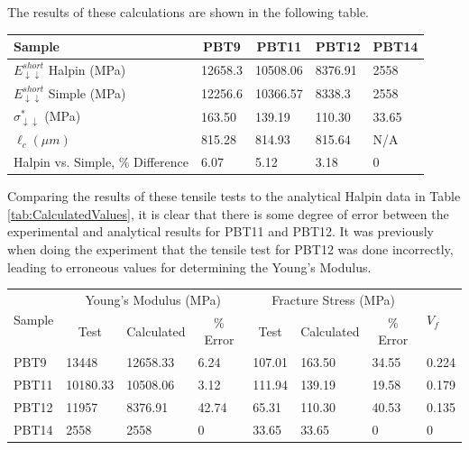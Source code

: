 \documentclass[11pt]{article}
\begin{document}
The results of these calculations are shown in the following table.
\\
\onehalfspacing
\begin{center}
 \label{tab:CalculatedValues}
\begin{tabular}{p{3.5cm} || p{} | p{} | p{} | p{}}
\hline
Sample & \multicolumn{1}{c|}{PBT9} & \multicolumn{1}{c|}{PBT11} & \multicolumn{1}{c|}{PBT12} & \multicolumn{1}{c}{PBT14} \\
\hline
\hline
\(E^{short}_{\downarrow \downarrow}\) Halpin (MPa)& 12658.3 &  10508.06 & 8376.91 & 2558\\
\(E^{short}_{\downarrow \downarrow}\) Simple (MPa)& 12256.6 & 10366.57 & 8338.3 & 2558\\
\(\sigma^*_{\downarrow \downarrow}\) (MPa)& 163.50 & 139.19 & 110.30 & 33.65\\
\(\ell_c (\mu m) \) & 815.28 & 814.93 & 815.64 & N/A\\
\hline
Halpin vs. Simple, \% Difference & 6.07 & 5.12 & 3.18 & 0\\
\hline
\end{tabular}
\end{center}
\singlespacing

Comparing the results of these tensile tests to the analytical Halpin data in Table \ref{tab:CalculatedValues}, it is clear that there is some degree of error between the experimental and analytical results for PBT11 and PBT12. It was previously when doing the experiment that the tensile test for PBT12 was done incorrectly, leading to erroneous values for determining the Young's Modulus.

\onehalfspacing
\begin{center}
 \label{tab:ComparingValues}
\begin{tabular}{p{1.25cm} || p{1.5cm} | p{1.5cm} | p{1.5cm} | p{1.5cm} | p{1.5cm} | p{1.5cm} | p{1cm}}
\hline
 \multirow{2}{*}{Sample} & \multicolumn{3}{c|}{Young's Modulus (MPa)}  & 
   \multicolumn{3}{c|}{Fracture Stress (MPa)} & \multirow{2}{*}{\(V_f\)} \\
   & \multicolumn{1}{c}{Test} & \multicolumn{1}{c}{Calculated} & \multicolumn{1}{c|}{\% Error} & \multicolumn{1}{c}{Test} & \multicolumn{1}{c}{Calculated} & \multicolumn{1}{c|}{\% Error} &\\
\hline
PBT9 & 13448 & 12658.33 & 6.24 & 107.01 & 163.50 & 34.55 & 0.224\\
PBT11 & 10180.33 & 10508.06 & 3.12 & 111.94 & 139.19 & 19.58 & 0.179\\
PBT12 & 11957 & 8376.91 & 42.74 & 65.31 & 110.30 & 40.53 & 0.135 \\
PBT14 & 2558 & 2558 & 0 & 33.65 & 33.65 & 0 & 0\\
\hline
\end{tabular}
\end{center}
\singlespacing
\end{document}
